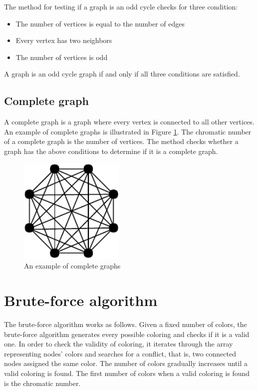 \documentclass[a4paper]{report}
\begin{document}
			The method for testing if a graph is an odd cycle checks for three condition:
			\begin{itemize}
				\item The number of vertices is equal to the number of edges
				\item Every vertex has two neighbors
				\item The number of vertices is odd
			\end{itemize}
			A graph is an odd cycle graph if and only if all three conditions are satisfied. \\
			
			\subsection{Complete graph}
			A complete graph is a graph where every vertex is connected to all other vertices. An example of complete graphs is illustrated in Figure \ref{fig:complete}. The chromatic number of a complete graph is the number of vertices. The method checks whether a graph has the above conditions to determine if it is a complete graph.\\
			
			\begin{figure}[h]
				\centering
				\includegraphics[width=50mm,scale=0.5]{figures/complete.pdf}
				\caption{An example of complete graphs}
				\label{fig:complete}
			\end{figure}
			
			
			
		\section{Brute-force algorithm}
		 The brute-force algorithm works as follows. Given a fixed number of colors, the brute-force algorithm generates every possible coloring and checks if it is a valid one. In order to check the validity of coloring, it iterates through the array representing nodes' colors and searches for a conflict, that is, two connected nodes assigned the same color. The number of colors gradually increases until a valid coloring is found. The first number of colors when a valid coloring is found is the chromatic number.\\
		
\end{document}
